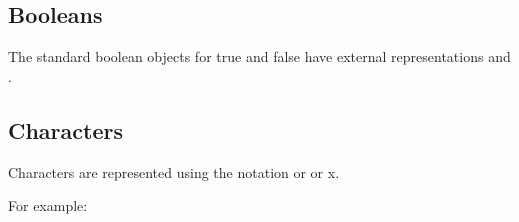 \subsection{Booleans}

The standard boolean objects for true and false have external representations
\schtrue{} and \schfalse.

\subsection{Characters}

Characters are represented using the notation
\sharpsign\backwhack{}\index{#\@\texttt{\sharpsign\backwhack}} or
\sharpsign\backwhack{} or
\sharpsign\backwhack{}x.

For example:

